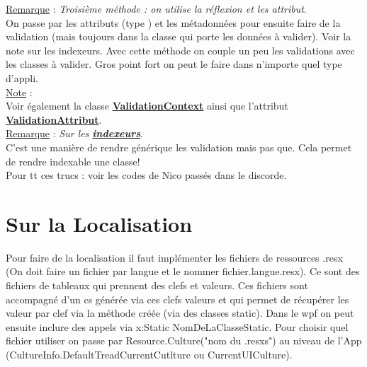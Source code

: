 \documentclass[a4paper,12pt,twoside]{article}
\newcommand{\urlcolor}{magenta}  %
\newcommand{\keycolor}{purple} %
\newcommand{\incode}[1]{{\footnotesize\ttfamily #1}} %
\newcommand{\rem}[2]{\noindent\underline{Remarque} : \textit{#1}.\\ \indent #2}
\newcommand{\note}[1]{\noindent\underline{Note} : \\ \indent #1}
\newcommand{\keyref}[2]{\hypersetup{urlcolor=\keycolor} \href{#1}{\textbf{#2}}\hypersetup{urlcolor=\urlcolor}}
\begin{document}
\rem{Troisième méthode : on utilise la réflexion et les attribut}{On passe par les attributs (type \incode{[required]}) et les métadonnées pour ensuite faire de la validation (mais toujours dans la classe qui porte les données à valider). Voir la note sur les indexeurs. Avec cette méthode on couple un peu les validations avec les classes à valider. Gros point fort on peut le faire dans n'importe quel type d'appli.}\\

\note{Voir également la classe \keyref{https://docs.microsoft.com/fr-fr/dotnet/api/system.componentmodel.dataannotations.validationcontext?view=net-6.0}{ValidationContext} ainsi que l'attribut \keyref{https://docs.microsoft.com/fr-fr/dotnet/api/system.componentmodel.dataannotations.validationattribute?view=net-6.0}{ValidationAttribut}.}\\

\rem{Sur les \keyref{https://docs.microsoft.com/fr-fr/dotnet/csharp/programming-guide/indexers/}{indexeurs}}{C'est une manière de rendre générique les validation mais pas que. Cela permet de rendre indexable une classe!}\\

Pour tt ces trucs : voir les codes de Nico passés dans le discorde.\\

\section{Sur la Localisation}

Pour faire de la localisation il faut implémenter les fichiers de ressources \incode{.resx} (On doit faire un fichier par langue et le nommer fichier.langue.resx). Ce sont des fichiers de tableaux qui prennent des clefs et valeurs. Ces fichiers sont accompagné d'un cs générée via ces clefs valeurs et qui permet de récupérer les valeur par clef via la méthode créée (via des classes static). Dans le wpf on peut ensuite inclure des appels via  x:Static NomDeLaClasseStatic. Pour choisir quel fichier utiliser on passe par \incode{Resource.Culture("nom du .resxs")} au niveau de l'App (CultureInfo.DefaultTreadCurrentCutlture ou CurrentUICulture).



\end{document}
